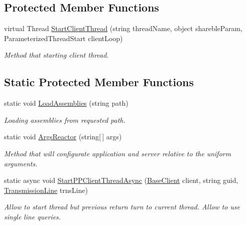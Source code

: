 \subsection*{Protected Member Functions}
\begin{DoxyCompactItemize}
\item 
virtual Thread \mbox{\hyperlink{class_uniform_client_1_1_base_client_a194b46bb0e889d07cade81c0aeab7cea}{Start\+Client\+Thread}} (string thread\+Name, object shareble\+Param, Parameterized\+Thread\+Start client\+Loop)
\begin{DoxyCompactList}\small\item\em Method that starting client thread. \end{DoxyCompactList}\end{DoxyCompactItemize}
\subsection*{Static Protected Member Functions}
\begin{DoxyCompactItemize}
\item 
static void \mbox{\hyperlink{class_uniform_client_1_1_base_client_a8abbd1d46cc50556eeae8bbd55ce680f}{Load\+Assemblies}} (string path)
\begin{DoxyCompactList}\small\item\em Loading assemblies from requested path. \end{DoxyCompactList}\item 
static void \mbox{\hyperlink{class_uniform_client_1_1_base_client_a7ec48981cf3e7ec10d2cb7dff81f912a}{Args\+Reactor}} (string\mbox{[}$\,$\mbox{]} args)
\begin{DoxyCompactList}\small\item\em Method that will configurate application and server relative to the uniform arguments. \end{DoxyCompactList}\item 
static async void \mbox{\hyperlink{class_uniform_client_1_1_base_client_a01e5a7ef4c760207cfa644ac2f6a407f}{Start\+P\+P\+Client\+Thread\+Async}} (\mbox{\hyperlink{class_uniform_client_1_1_base_client}{Base\+Client}} client, string guid, \mbox{\hyperlink{class_pipes_provider_1_1_client_1_1_transmission_line}{Transmission\+Line}} trns\+Line)
\begin{DoxyCompactList}\small\item\em Allow to start thread but previous return turn to current thread. Allow to use single line queries. \end{DoxyCompactList}\end{DoxyCompactItemize}

